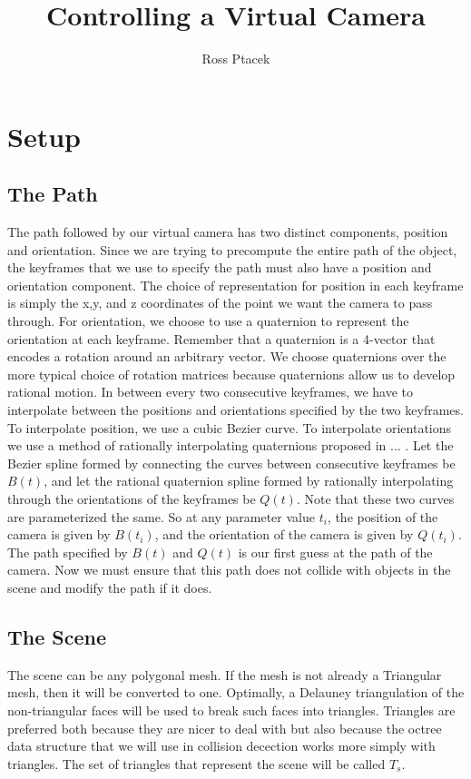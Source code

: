 \documentclass[12pt]{article}
\title{Controlling a Virtual Camera}
\author{Ross Ptacek}
\begin{document}
\maketitle

\begin{abstract}

\end{abstract}

\section{Setup}
\subsection{The Path}
The path followed by our virtual camera has two distinct components, position
and orientation.
Since we are trying to precompute the entire path of the object, the keyframes
that we use to specify the path must also have a position and orientation 
component.
The choice of representation for position in each keyframe is simply the x,y,
and z coordinates of the point we want the camera to pass through.
For orientation, we choose to use a quaternion to represent the orientation at
each keyframe.
Remember that a quaternion is a 4-vector that encodes a rotation around an
arbitrary vector.
We choose quaternions over the more typical choice of rotation matrices because
quaternions allow us to develop rational motion.
In between every two consecutive keyframes, we have to interpolate between the
positions and orientations specified by the two keyframes.
To interpolate position, we use a cubic Bezier curve.
To interpolate orientations we use a method of rationally interpolating 
quaternions proposed in ... .
Let the Bezier spline formed by connecting the curves between consecutive
keyframes be $B(t)$, and let the rational quaternion spline formed by 
rationally interpolating through the orientations of the keyframes be $Q(t)$.
Note that these two curves are parameterized the same.
So at any parameter value $t_{i}$, the position of the camera is given by
$B(t_{i})$, and the orientation of the camera is given by $Q(t_{i})$.
The path specified by $B(t)$ and $Q(t)$ is our first guess at the path of the
camera.
Now we must ensure that this path does not collide with objects in the scene
and modify the path if it does.

\subsection{The Scene}
The scene can be any polygonal mesh.
If the mesh is not already a Triangular mesh, then it will be converted to one.
Optimally, a Delauney triangulation of the non-triangular faces will be used to
break such faces into triangles.
Triangles are preferred both because they are nicer to deal with but also
because the octree data structure that we will use in collision decection works
more simply with triangles.
The set of triangles that represent the scene will be called $T_{s}$.
\end{document}
